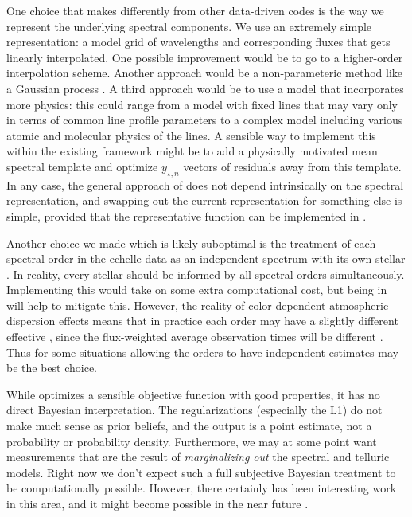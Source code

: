 \documentclass[twocolumn]{aastex62}
\begin{document}
One choice that \wobble makes differently from other data-driven \RV codes is the way we represent the underlying spectral components. 
We use an extremely simple representation: a model grid of wavelengths and corresponding fluxes that gets linearly interpolated. 
One possible improvement would be to go to a higher-order interpolation scheme. 
Another approach would be a non-parameteric method like a Gaussian process \citep[as in][]{Czekala2017}. 
A third approach would be to use a model that incorporates more physics: this could range from a model with fixed lines that may vary only in terms of common line profile parameters to a complex model including various atomic and molecular physics of the lines. 
A sensible way to implement this within the existing \wobble framework might be to add a physically motivated mean spectral template and optimize $y_{\star, n}$ vectors of residuals away from this template. 
In any case, the general approach of \wobble does not depend intrinsically on the spectral representation, and swapping out the current representation for something else is simple, provided that the representative function can be implemented in \TF.

Another choice we made which is likely suboptimal is the treatment of each spectral order in the echelle data as an independent spectrum with its own stellar \RV. 
In reality, every stellar \RV should be informed by all spectral orders simultaneously. 
Implementing this would take on some extra computational cost, but being in \TF will help to mitigate this. 
However, the reality of color-dependent atmospheric dispersion effects means that in practice each order may have a slightly different effective \RV, since the flux-weighted average observation times will be different \citep{Blackman2017}. 
Thus for some situations allowing the orders to have independent \RV estimates may be the best choice.

While \wobble optimizes a sensible objective function with good properties, it has no direct Bayesian interpretation. 
The regularizations (especially the L1) do not make much sense as prior beliefs, and the output is a point estimate, not a probability or probability density. 
Furthermore, we may at some point want \RV measurements that are the result of \emph{marginalizing out} the spectral and telluric models. 
Right now we don't expect such a full subjective Bayesian treatment to be computationally possible.
However, there certainly has been interesting work in this area, and it might become possible in the near future \citep{Czekala2015}.
\end{document}
